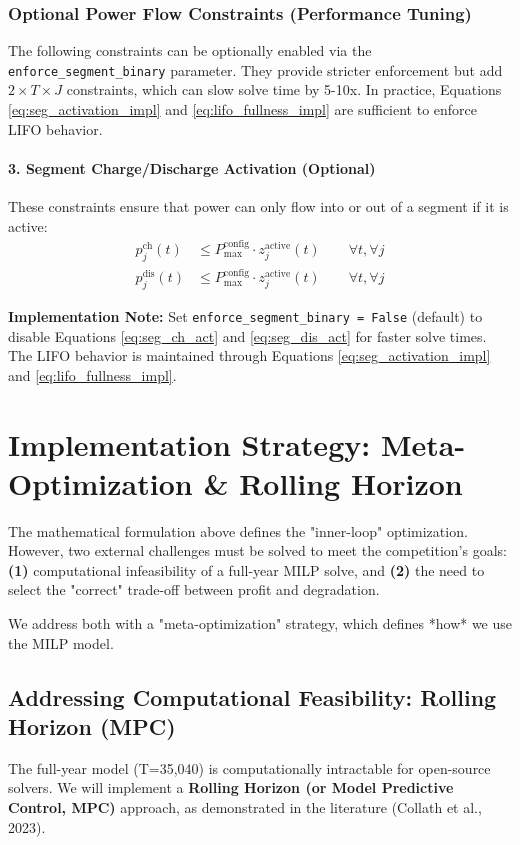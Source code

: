\documentclass[11pt, a4paper]{article}
\begin{document}
\subsubsection{Optional Power Flow Constraints (Performance Tuning)}

The following constraints can be optionally enabled via the \texttt{enforce\_segment\_binary} parameter. They provide stricter enforcement but add $2 \times T \times J$ constraints, which can slow solve time by 5-10x. In practice, Equations \eqref{eq:seg_activation_impl} and \eqref{eq:lifo_fullness_impl} are sufficient to enforce LIFO behavior.

\paragraph{3. Segment Charge/Discharge Activation (Optional)}
These constraints ensure that power can only flow into or out of a segment if it is active:
\begin{align}
    p^{\mathrm{ch}}_{j}(t) &\le P^{\mathrm{config}}_{\max} \cdot z^{\text{active}}_{j}(t) \qquad \forall t, \forall j \label{eq:seg_ch_act}\\
    p^{\mathrm{dis}}_{j}(t) &\le P^{\mathrm{config}}_{\max} \cdot z^{\text{active}}_{j}(t) \qquad \forall t, \forall j \label{eq:seg_dis_act}
\end{align}

\textbf{Implementation Note:} Set \texttt{enforce\_segment\_binary = False} (default) to disable Equations \eqref{eq:seg_ch_act} and \eqref{eq:seg_dis_act} for faster solve times. The LIFO behavior is maintained through Equations \eqref{eq:seg_activation_impl} and \eqref{eq:lifo_fullness_impl}.




\section{Implementation Strategy: Meta-Optimization \& Rolling Horizon}
The mathematical formulation above defines the "inner-loop" optimization. However, two external challenges must be solved to meet the competition's goals: \textbf{(1)} computational infeasibility of a full-year MILP solve, and \textbf{(2)} the need to select the "correct" trade-off between profit and degradation.

We address both with a "meta-optimization" strategy, which defines *how* we use the MILP model.

\subsection{Addressing Computational Feasibility: Rolling Horizon (MPC)}
The full-year model (T=35,040) is computationally intractable for open-source solvers. We will implement a \textbf{Rolling Horizon (or Model Predictive Control, MPC)} approach, as demonstrated in the literature (Collath et al., 2023).
\end{document}
